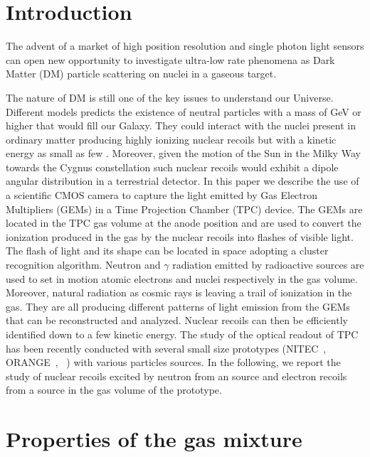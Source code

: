 \documentclass[12pt]{iopart}
\begin{document}
\section{Introduction}

The advent of a market of high position resolution and single photon
light sensors can open new opportunity to investigate ultra-low rate
phenomena as Dark Matter (DM) particle scattering on nuclei in a
gaseous target.

The nature of DM is still one of the key issues to understand our
Universe. Different models predicts the existence of neutral particles
with a mass of GeV or higher that would fill our Galaxy. They could
interact with the nuclei present in ordinary matter producing highly
ionizing nuclear recoils but with a kinetic energy as small as few
\keV. Moreover, given the motion of the Sun in the Milky Way towards
the Cygnus constellation such nuclear recoils would exhibit a dipole
angular distribution in a terrestrial detector.  In this paper we
describe the use of a scientific CMOS camera to capture the light
emitted by Gas Electron Multipliers (GEMs) in a Time Projection
Chamber (TPC) device. The GEMs are located in the TPC gas volume at
the anode position and are used to convert the ionization produced in
the gas by the nuclear recoils into flashes of visible light. The
flash of light and its shape can be located in space adopting a
cluster recognition algorithm. Neutron and $\gamma$ radiation emitted
by radioactive sources are used to set in motion atomic electrons and
nuclei respectively in the gas volume. Moreover, natural radiation as
cosmic rays is leaving a trail of ionization in the gas. They are all
producing different patterns of light emission from the GEMs that can
be reconstructed and analyzed. Nuclear recoils can then be efficiently
identified down to a few \keV kinetic energy.  The study of the
optical readout of TPC has been recently conducted with several small
size prototypes (NITEC~\cite{JINST:nitec},
ORANGE~\cite{NIM:Marafinietal, bib:jinst_orange2},
\lemon~\cite{bib:eps, bib:ieee17, bib:elba}) with various particles
sources. In the following, we report the study of nuclear recoils
excited by neutron from an \ambe source and electron recoils from a \fe
source in the gas volume of the \lemon prototype.

\section{Properties of the gas mixture}
\end{document}
